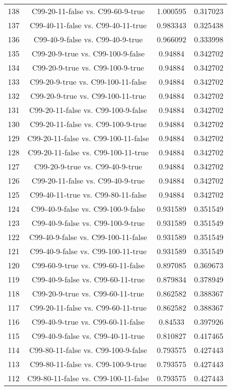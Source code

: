 \documentclass[a4paper,10pt]{article}
\begin{document}
\begin{landscape}
\begin{table}[!htp]
\begin{tabular}{cccc}
138&C99-20-11-false vs. C99-60-9-true&1.000595&0.317023\\
137&C99-40-11-false vs. C99-40-11-true&0.983343&0.325438\\
136&C99-40-9-false vs. C99-40-9-true&0.966092&0.333998\\
135&C99-20-9-true vs. C99-100-9-false&0.94884&0.342702\\
134&C99-20-9-true vs. C99-100-9-true&0.94884&0.342702\\
133&C99-20-9-true vs. C99-100-11-false&0.94884&0.342702\\
132&C99-20-9-true vs. C99-100-11-true&0.94884&0.342702\\
131&C99-20-11-false vs. C99-100-9-false&0.94884&0.342702\\
130&C99-20-11-false vs. C99-100-9-true&0.94884&0.342702\\
129&C99-20-11-false vs. C99-100-11-false&0.94884&0.342702\\
128&C99-20-11-false vs. C99-100-11-true&0.94884&0.342702\\
127&C99-20-9-true vs. C99-40-9-true&0.94884&0.342702\\
126&C99-20-11-false vs. C99-40-9-true&0.94884&0.342702\\
125&C99-40-11-true vs. C99-80-11-false&0.94884&0.342702\\
124&C99-40-9-false vs. C99-100-9-false&0.931589&0.351549\\
123&C99-40-9-false vs. C99-100-9-true&0.931589&0.351549\\
122&C99-40-9-false vs. C99-100-11-false&0.931589&0.351549\\
121&C99-40-9-false vs. C99-100-11-true&0.931589&0.351549\\
120&C99-60-9-true vs. C99-60-11-false&0.897085&0.369673\\
119&C99-40-9-false vs. C99-60-11-true&0.879834&0.378949\\
118&C99-20-9-true vs. C99-60-11-true&0.862582&0.388367\\
117&C99-20-11-false vs. C99-60-11-true&0.862582&0.388367\\
116&C99-40-9-true vs. C99-60-11-false&0.84533&0.397926\\
115&C99-40-9-false vs. C99-40-11-true&0.810827&0.417465\\
114&C99-80-11-false vs. C99-100-9-false&0.793575&0.427443\\
113&C99-80-11-false vs. C99-100-9-true&0.793575&0.427443\\
112&C99-80-11-false vs. C99-100-11-false&0.793575&0.427443\\

\end{tabular}
\end{table}
\end{landscape}
\end{document}

